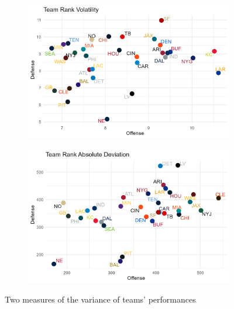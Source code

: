 \documentclass{article}
\begin{document}
\begin{figure}[ht]
    \centering
    \begin{subfigure}{0.48\textwidth}
        \centering
        \includegraphics[width=\textwidth]{../plots/volatility.png}
    \end{subfigure}\hfill
    \begin{subfigure}{0.48\textwidth}
        \centering
        \includegraphics[width=\textwidth]{../plots/abs_dev.png}
    \end{subfigure}
    \caption{Two measures of the variance of teams' performances}
\end{figure}
\end{document}
